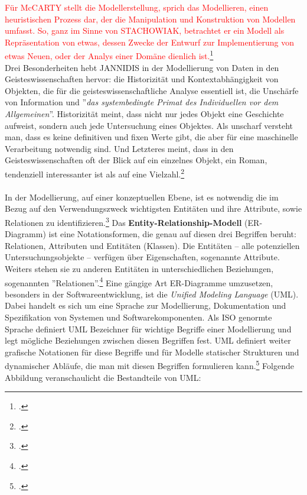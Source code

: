 \documentclass[12pt,a4paper]{article}
\begin{document}
\textcolor{red}{
Für McCARTY stellt die Modellerstellung, sprich das Modellieren, einen heuristischen Prozess dar, der die Manipulation und Konstruktion von Modellen umfasst. So, ganz im Sinne von STACHOWIAK, betrachtet er ein Modell als Repräsentation von etwas, dessen Zwecke der Entwurf zur Implementierung von etwas Neuen, oder der Analys einer Domäne dienlich ist.}\footcite[][S.255]{mccarty2004modeling}
\\
Drei Besonderheiten hebt JANNIDIS in der Modellierung von Daten in den Geisteswissenschaften hervor: die Historizität und Kontextabhängigkeit von Objekten, die für die geisteswissenschaftliche Analyse essentiell ist, die Unschärfe von Information und ''\textit{das systembedingte Primat des Individuellen vor dem Allgemeinen}''. Historizität meint, dass nicht nur jedes Objekt eine Geschichte aufweist, sondern auch jede Untersuchung eines Objektes. Als unscharf versteht man, dass es keine definitiven und fixen Werte gibt, die aber für eine maschinelle Verarbeitung notwendig sind. Und Letzteres meint, dass in den Geisteswissenschaften oft der Blick auf ein einzelnes Objekt, ein Roman, tendenziell interessanter ist als auf eine Vielzahl.\footcite[][S.106-108]{jannidis2017grundlagen}
\\
\\
In der Modellierung, auf einer konzeptuellen Ebene, ist es notwendig die im Bezug auf den Verwendungszweck wichtigsten Entitäten und ihre Attribute, sowie Relationen zu identifizieren.\footcite[][S.102-104]{jannidis2017grundlagen} Das \textbf{Entity-Relationship-Modell} (ER-Diagramm) ist eine Notationsformen, die genau auf diesen drei Begriffen beruht: Relationen, Attributen und Entitäten (Klassen). Die Entitäten -- alle potenziellen Untersuchungsobjekte -- verfügen über Eigenschaften, sogenannte Attribute. Weiters stehen sie zu anderen Entitäten in unterschiedlichen Beziehungen, sogenannten ''Relationen''.\footcite{chen1976entity} Eine gängige Art ER-Diagramme umzusetzen, besonders in der Softwareentwicklung, ist die \textit{Unified Modeling Language} (UML). Dabei handelt es sich um eine Sprache zur Modellierung, Dokumentation und Spezifikation von Systemen und Softwarekomponenten. Als ISO genormte Sprache definiert UML Bezeichner für wichtige Begriffe einer Modellierung und legt mögliche Beziehungen zwischen diesen Begriffen fest. UML definiert weiter grafische Notationen für diese Begriffe und für Modelle statischer Strukturen und dynamischer Abläufe, die man mit diesen Begriffen formulieren kann.\footcite{rumbaugh2004unified} Folgende Abbildung veranschaulicht die Bestandteile von UML:
\end{document}
